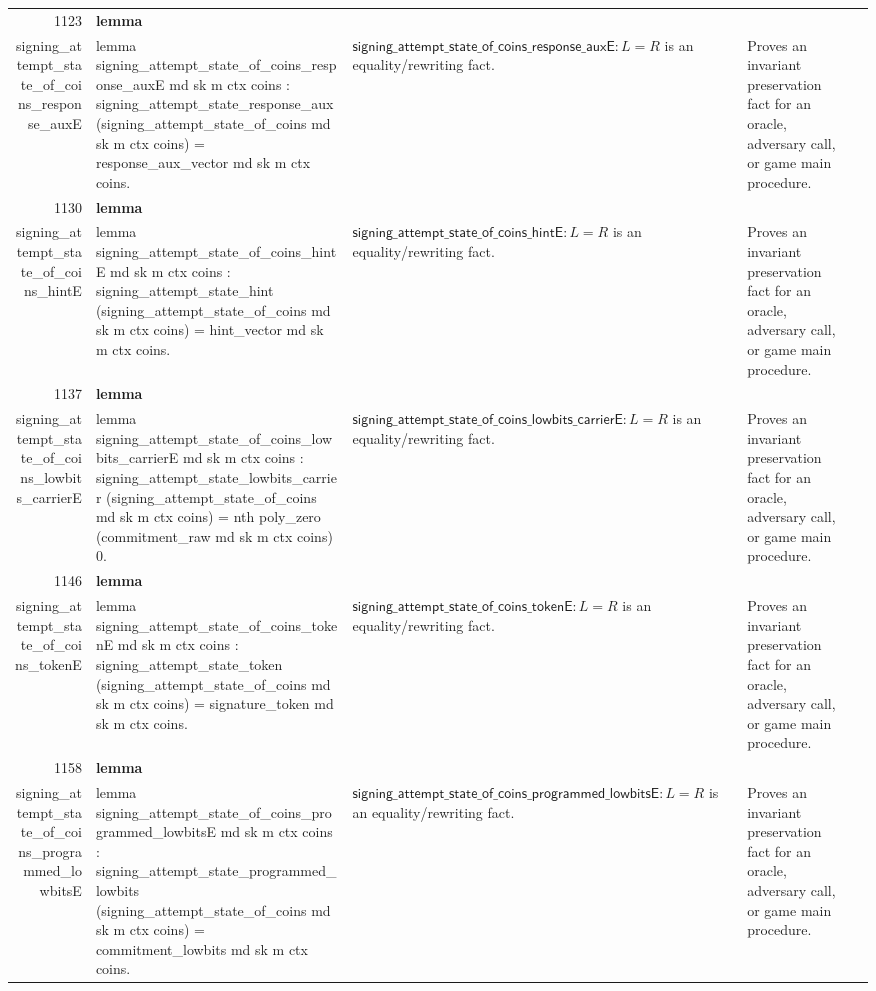\documentclass[10pt]{article}
\newcommand{\ec}[1]{\begingroup\ttfamily\scriptsize #1\endgroup}
\begin{document}
\begin{longtable}{r L{0.17\textwidth} L{0.26\textwidth} L{0.27\textwidth} L{0.20\textwidth}}
1123 & \textbf{lemma}\\\ec{signing\_attempt\_state\_of\_coins\_response\_auxE} & \ec{lemma signing\_attempt\_state\_of\_coins\_response\_auxE md sk m ctx coins : signing\_attempt\_state\_response\_aux (signing\_attempt\_state\_of\_coins md sk m ctx coins) = response\_aux\_vector md sk m ctx coins.} & \(\mathsf{signing\_attempt\_state\_of\_coins\_response\_auxE} : L = R\) is an equality/rewriting fact. & Proves an invariant preservation fact for an oracle, adversary call, or game main procedure. \\
1130 & \textbf{lemma}\\\ec{signing\_attempt\_state\_of\_coins\_hintE} & \ec{lemma signing\_attempt\_state\_of\_coins\_hintE md sk m ctx coins : signing\_attempt\_state\_hint (signing\_attempt\_state\_of\_coins md sk m ctx coins) = hint\_vector md sk m ctx coins.} & \(\mathsf{signing\_attempt\_state\_of\_coins\_hintE} : L = R\) is an equality/rewriting fact. & Proves an invariant preservation fact for an oracle, adversary call, or game main procedure. \\
1137 & \textbf{lemma}\\\ec{signing\_attempt\_state\_of\_coins\_lowbits\_carrierE} & \ec{lemma signing\_attempt\_state\_of\_coins\_lowbits\_carrierE md sk m ctx coins : signing\_attempt\_state\_lowbits\_carrier (signing\_attempt\_state\_of\_coins md sk m ctx coins) = nth poly\_zero (commitment\_raw md sk m ctx coins) 0.} & \(\mathsf{signing\_attempt\_state\_of\_coins\_lowbits\_carrierE} : L = R\) is an equality/rewriting fact. & Proves an invariant preservation fact for an oracle, adversary call, or game main procedure. \\
1146 & \textbf{lemma}\\\ec{signing\_attempt\_state\_of\_coins\_tokenE} & \ec{lemma signing\_attempt\_state\_of\_coins\_tokenE md sk m ctx coins : signing\_attempt\_state\_token (signing\_attempt\_state\_of\_coins md sk m ctx coins) = signature\_token md sk m ctx coins.} & \(\mathsf{signing\_attempt\_state\_of\_coins\_tokenE} : L = R\) is an equality/rewriting fact. & Proves an invariant preservation fact for an oracle, adversary call, or game main procedure. \\
1158 & \textbf{lemma}\\\ec{signing\_attempt\_state\_of\_coins\_programmed\_lowbitsE} & \ec{lemma signing\_attempt\_state\_of\_coins\_programmed\_lowbitsE md sk m ctx coins : signing\_attempt\_state\_programmed\_lowbits (signing\_attempt\_state\_of\_coins md sk m ctx coins) = commitment\_lowbits md sk m ctx coins.} & \(\mathsf{signing\_attempt\_state\_of\_coins\_programmed\_lowbitsE} : L = R\) is an equality/rewriting fact. & Proves an invariant preservation fact for an oracle, adversary call, or game main procedure. \\

\end{longtable}
\end{document}
